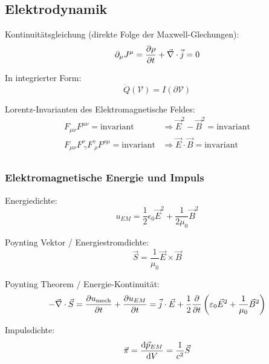 \documentclass[11pt]{article}
\numberwithin{equation}{section}
\begin{document}
		\subsection{Elektrodynamik}
			\noindent
			Kontinuitätsgleichung (direkte Folge der Maxwell-Glechungen):
			\begin{equation}
				\partial_\mu J^\mu = \frac{\partial \rho}{\partial t} + \vec{\nabla}\cdot\vec{j} = 0
			\end{equation}

			\noindent
			In integrierter Form:
			\begin{equation}
				\dot{Q}(\mathcal{V}) = I(\partial\mathcal{V})
			\end{equation}

			\noindent
			Lorentz-Invarianten des Elektromagnetische Feldes:
			\begin{equation}
				\begin{aligned}
					F_{\mu\nu} F^{\mu\nu} = \mathrm{invariant} &\Rightarrow \vec{E}^2 - \vec{B}^2 = \mathrm{invariant} \\
					F_{\mu\nu} F^{\nu}_{\;\gamma} F^{\gamma}_{\;\rho} F^{\rho\mu} = \mathrm{invariant} &\Rightarrow \vec{E}\cdot \vec{B} = \mathrm{invariant} \\
				\end{aligned}
			\end{equation}

			\subsubsection{Elektromagnetische Energie und Impuls}
				\noindent
				Energiedichte:
				\begin{equation}
					u_{EM}=\frac{1}{2}\epsilon_0 \vec{E}^2+\frac{1}{2\mu_0}\vec{B}^2
				\end{equation}

				\noindent
				Poynting Vektor / Energiestromdichte:
				\begin{equation}
					\vec{S} = \frac{1}{\mu_0}\vec{E}\times\vec{B}
				\end{equation}

				\noindent
				Poynting Theorem / Energie-Kontinuität:
				\begin{equation}
					-\vec{\nabla}\cdot\vec{S}
					= \frac{\partial u_{\mathrm{mech}}}{\partial t} + \frac{\partial u_{EM}}{\partial t}
					= \vec{j}\cdot\vec{E} + \frac{1}{2}\frac{\partial }{\partial t}\left( \varepsilon_0\vec{E}^2 + \frac{1}{\mu_0}\vec{B}^2 \right)
				\end{equation}

				\noindent
				Impulsdichte:
				\begin{equation}
					\vec{\pi} = \frac{\mathrm{d} \vec{p}_{EM}}{\mathrm{d} V} = \frac{1}{c^2}\vec{S}
				\end{equation}
\end{document}
